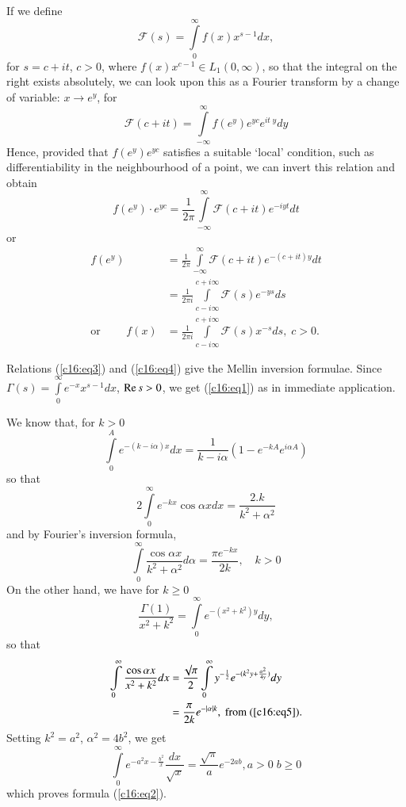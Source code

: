 If we define
\begin{equation*}
 \mathscr{F} (s) = \int\limits^\infty_0 f(x) x^{s-1} dx, \tag{3}\label{c16:eq3}
\end{equation*}
for $s = c+ it$, $c>0$, where $f(x) x^{c-1}\in L_1 (0,\infty)$, so
that the integral on the right exists absolutely, we can look upon
this as a Fourier transform by a change of variable: $x\to e^y$, for 
$$
\mathscr{F} (c+it) = \int\limits^\infty_{-\infty} f(e^y) e^{yc} e^{it
  \; y}  dy
$$
Hence, provided that $f(e^y) e^{yc}$ satisfies a suitable `local'
condition, such as differentiability in the neighbourhood of a point,
we can invert this relation and obtain
$$
f(e^y) \cdot e^{yc} = \frac{1}{2\pi} \int\limits^\infty_{-\infty}
\mathscr{F} (c+it) e^{-iyt} dt
$$
or\pageoriginale
\begin{align*}
f(e^y) & = \frac{1}{2\pi} \int\limits^\infty_{-\infty} \mathscr{F}
(c+it) e^{-(c+it)y} dt\\
& = \frac{1}{2\pi i} \int\limits^{c+i\infty}_{c-i\infty} \mathscr{F}
(s)  e^{-ys} ds\\
\text{or } \qquad f(x) & = \frac{1}{2\pi i}
\int\limits^{c+i\infty}_{c-i\infty} \mathscr{F}(s) x^{-s} ds, \; c>0. \tag{4}\label{c16:eq4}
\end{align*}

Relations (\ref{c16:eq3}) and (\ref{c16:eq4}) give the Mellin inversion formulae. 
Since $\Gamma(s) = \int\limits^\infty_0 e^{-x} x^{s-1} dx$, $\operatorname{Re} s
>0$, we get (\ref{c16:eq1}) as in immediate application.

We know that, for $k>0$
$$
\int\limits^A_0 e^{-(k-i\alpha)x} dx = \frac{1}{k-i\alpha}
\left(1-e^{-kA} e^{i\alpha A} \right)
$$
so that
$$
2 \int\limits^\infty_0 e^{-kx} \cos \alpha x dx = \frac{2.k}{k^2+\alpha^2}
$$
and by Fourier's inversion formula,
\begin{equation*}
\int\limits^\infty_0 \frac{\cos \alpha x}{k^2 + \alpha^2} d \alpha =
\frac{\pi e^{-kx}}{2k}, \quad k>0 \tag{5}\label{c16:eq5}
\end{equation*}
On the other hand, we have for $k \geq 0$
$$
\frac{\Gamma(1)}{x^2 + k^2} = \int\limits^\infty_0 e^{-(x^2 + k^2)y} dy,
$$
so that\pageoriginale
\begin{align*}
\int\limits^\infty_0 \frac{\cos \alpha x}{x^2+k^2} dx & = \frac{\surd
  \pi}{2} \int\limits^\infty_0 y^{-\frac{1}{2}} e^{-(k^2 y +
  \frac{\alpha^2}{4y})} dy\\
& = \frac{\pi}{2k} e^{-|\alpha|k} , \text{ from (\ref{c16:eq5})}.
\end{align*}
Setting $k^2 = a^2$, $\alpha^2 = 4b^2$, we get
$$
\int\limits^\infty_0 e^{-a^2 x -\frac{b^2}{x}} \frac{dx}{\surd x} =
\frac{\surd \pi }{a} e^{-2ab}, a > 0 \;  b\ge 0
$$
which proves formula (\ref{c16:eq2}).

